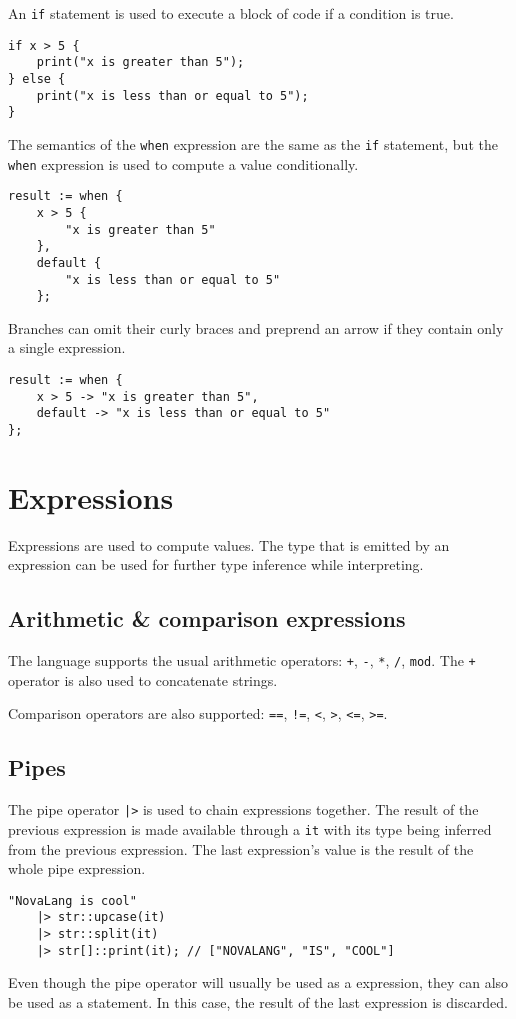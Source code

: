 \documentclass[conference]{IEEEtran}
\begin{document}
An \texttt{if} statement is used to execute a block of code if a condition is true.

\begin{lstlisting}
if x > 5 {
    print("x is greater than 5");
} else {
    print("x is less than or equal to 5");
}
\end{lstlisting}

The semantics of the \texttt{when} expression are the same as the \texttt{if} statement, but the \texttt{when} expression is used to compute a value conditionally.

\begin{lstlisting}
result := when {
    x > 5 {
        "x is greater than 5"
    },
    default {
        "x is less than or equal to 5"
    };
\end{lstlisting}

Branches can omit their curly braces and preprend an arrow if they contain only a single expression.

\begin{lstlisting}
result := when {
    x > 5 -> "x is greater than 5",
    default -> "x is less than or equal to 5"
};
\end{lstlisting}

\section{Expressions}

Expressions are used to compute values.
The type that is emitted by an expression can be used for further type inference while interpreting.

\subsection{Arithmetic \& comparison expressions}

The language supports the usual arithmetic operators: \texttt{+}, \texttt{-}, \texttt{*}, \texttt{/}, \texttt{mod}.
The \texttt{+} operator is also used to concatenate strings.

Comparison operators are also supported: \texttt{==}, \texttt{!=}, \texttt{<}, \texttt{>}, \texttt{<=}, \texttt{>=}.

\subsection{Pipes}

The pipe operator \texttt{|>} is used to chain expressions together.
The result of the previous expression is made available through a \texttt{it} with its type being inferred from the previous expression.
The last expression's value is the result of the whole pipe expression.

\begin{lstlisting}
"NovaLang is cool" 
    |> str::upcase(it)
    |> str::split(it)
    |> str[]::print(it); // ["NOVALANG", "IS", "COOL"]
\end{lstlisting}

Even though the pipe operator will usually be used as a expression, they can also be used as a statement.
In this case, the result of the last expression is discarded.
\end{document}
